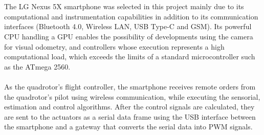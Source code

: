 \\\\
The LG Nexus 5X smartphone was selected in this project mainly due to its computational and instrumentation capabilities in addition to its communication interfaces (Bluetooth 4.0, Wireless LAN, USB Type-C and GSM). Its powerful CPU handling a GPU enables the possibility of developments using the camera for visual odometry, and controllers whose execution represents a high computational load, which exceeds the limits of a standard microcontroller such as the ATmega 2560.
\\\\
As the quadrotor's flight controller, the smartphone receives remote orders from the quadrotor's pilot using wireless communication, while executing the sensorial, estimation and control algorithms. After the control signals are calculated, they are sent to the actuators as a serial data frame using the USB interface between the smartphone and a gateway that converts the serial data into PWM signals.

